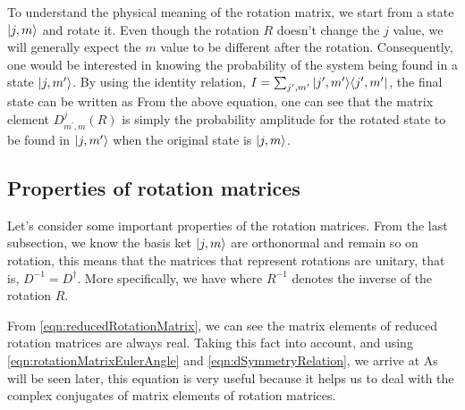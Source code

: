 To understand the physical meaning of the rotation matrix, we start from a state $| j, m \rangle$ and rotate it. Even though
the rotation $R$ doesn't change the $j$ value, we will generally expect the $m$ value to be different after the rotation. 
Consequently, one would be interested in knowing the probability of the system being found in a state $| j, m^{\prime} \rangle$. By using the identity relation, $I = \sum_{j', m'}| j', m' \rangle\langle j', m' |$, the final state can be written as
From the above equation, one can see that the matrix element $D^{j}_{m^{\prime}, m}(R)$ is simply the 
probability amplitude for the rotated state to
be found in $| j, m^{\prime} \rangle$ when the original state is $| j, m \rangle$. 

\subsection{Properties of rotation matrices}

Let's consider some important properties of the rotation matrices. From the last subsection, we know  the basis ket 
$| j, m \rangle$ are orthonormal and remain so on rotation, this means that the matrices that represent rotations are
unitary, that is, $D^{-1} = D^{\dagger}$. More specifically, we have 
where $R^{-1}$ denotes the inverse of the rotation $R$. 

From \autoref{eqn:reducedRotationMatrix}, we can see the matrix elements of reduced rotation matrices are always
 real. Taking this fact into account, and using  \autoref{eqn:rotationMatrixEulerAngle} and \autoref{eqn:dSymmetryRelation}, we arrive at
As will be seen later, this equation is very useful because it helps us to deal with the complex conjugates of matrix 
elements of rotation matrices. 

